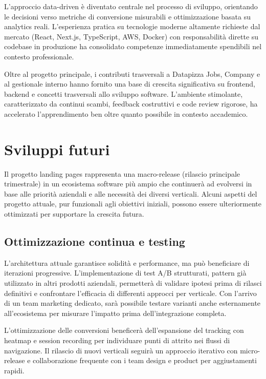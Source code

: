 \medskip
L'approccio data-driven è diventato centrale nel processo di sviluppo, orientando 
le decisioni verso metriche di conversione misurabili e ottimizzazione basata su 
analytics reali. L'esperienza pratica su tecnologie moderne altamente richieste 
dal mercato (React, Next.js, TypeScript, AWS, Docker) con responsabilità dirette 
su codebase in produzione ha consolidato competenze immediatamente spendibili nel 
contesto professionale.

\medskip
Oltre al progetto principale, i contributi trasversali a Datapizza Jobs, Company
e al gestionale interno hanno fornito una base di crescita significativa su frontend, 
backend e concetti trasversali allo sviluppo software. L'ambiente stimolante, 
caratterizzato da continui scambi, feedback costruttivi e code review rigorose, 
ha accelerato l'apprendimento ben oltre quanto possibile in contesto accademico.

\section{Sviluppi futuri}

Il progetto landing pages rappresenta una macro-release (rilascio principale 
trimestrale) in un ecosistema software più ampio che continuerà ad evolversi 
in base alle priorità aziendali e alle necessità dei diversi verticali. Alcuni 
aspetti del progetto attuale, pur funzionali agli obiettivi iniziali, possono 
essere ulteriormente ottimizzati per supportare la crescita futura.

\subsection{Ottimizzazione continua e testing}

L'architettura attuale garantisce solidità e performance, ma può beneficiare 
di iterazioni progressive. L'implementazione di test A/B strutturati, pattern 
già utilizzato in altri prodotti aziendali, permetterà di validare ipotesi 
prima di rilasci definitivi e confrontare l'efficacia di differenti approcci 
per verticale. Con l'arrivo di un team marketing dedicato, sarà possibile 
testare varianti anche esternamente all'ecosistema per misurare l'impatto 
prima dell'integrazione completa.

L'ottimizzazione delle conversioni beneficerà dell'espansione del tracking 
con heatmap e session recording per individuare punti di attrito nei flussi 
di navigazione. Il rilascio di nuovi verticali seguirà un approccio iterativo 
con micro-release e collaborazione frequente con i team design e product per 
aggiustamenti rapidi.

